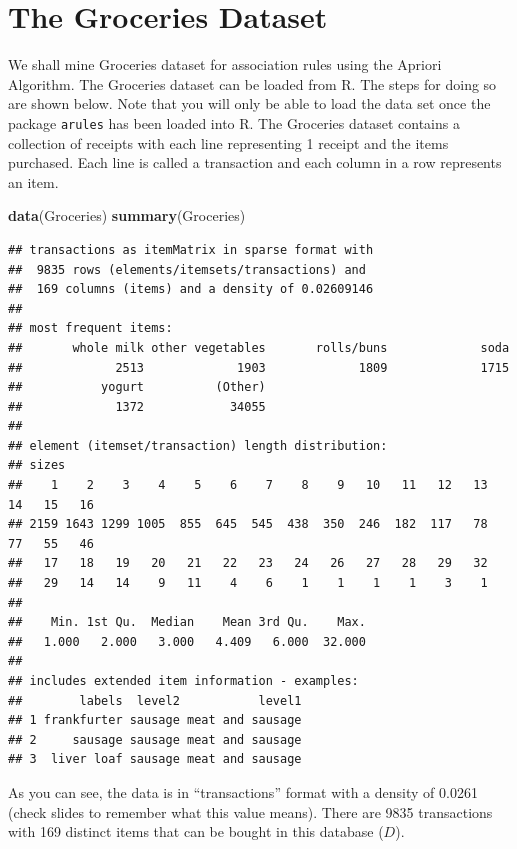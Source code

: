 \documentclass[
]{book}
\newenvironment{Shaded}{\begin{snugshade}}{\end{snugshade}}
\newcommand{\KeywordTok}[1]{\textcolor[rgb]{0.13,0.29,0.53}{\textbf{#1}}}
\newcommand{\NormalTok}[1]{#1}
\begin{document}
\hypertarget{the-groceries-dataset}{%
\section{The Groceries Dataset}\label{the-groceries-dataset}}

We shall mine Groceries dataset for association rules using the Apriori Algorithm. The Groceries dataset can be loaded from R. The steps for doing so are shown below. Note that you will only be able to load the data set once the package \texttt{arules} has been loaded into R. The Groceries dataset contains a collection of receipts with each line representing 1 receipt and the items purchased. Each line is called a transaction and each column in a row represents an item.

\begin{Shaded}
\begin{Highlighting}[]
\KeywordTok{data}\NormalTok{(Groceries)}
\KeywordTok{summary}\NormalTok{(Groceries)}
\end{Highlighting}
\end{Shaded}

\begin{verbatim}
## transactions as itemMatrix in sparse format with
##  9835 rows (elements/itemsets/transactions) and
##  169 columns (items) and a density of 0.02609146 
## 
## most frequent items:
##       whole milk other vegetables       rolls/buns             soda 
##             2513             1903             1809             1715 
##           yogurt          (Other) 
##             1372            34055 
## 
## element (itemset/transaction) length distribution:
## sizes
##    1    2    3    4    5    6    7    8    9   10   11   12   13   14   15   16 
## 2159 1643 1299 1005  855  645  545  438  350  246  182  117   78   77   55   46 
##   17   18   19   20   21   22   23   24   26   27   28   29   32 
##   29   14   14    9   11    4    6    1    1    1    1    3    1 
## 
##    Min. 1st Qu.  Median    Mean 3rd Qu.    Max. 
##   1.000   2.000   3.000   4.409   6.000  32.000 
## 
## includes extended item information - examples:
##        labels  level2           level1
## 1 frankfurter sausage meat and sausage
## 2     sausage sausage meat and sausage
## 3  liver loaf sausage meat and sausage
\end{verbatim}

As you can see, the data is in ``transactions'' format with a density of 0.0261 (check slides to remember what this value means). There are 9835 transactions with 169 distinct items that can be bought in this database (\(D\)).
\end{document}
